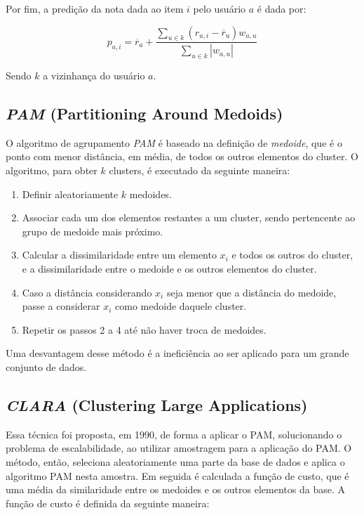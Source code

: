 \documentclass[12pt,a4paper,header]{abnt}
\begin{document}
Por fim, a predição da nota dada ao item $i$ pelo usuário $a$ é dada por:

\begin{equation}
p_{a, i} = \overline{r}_a + \frac{\sum_{u \in k}{(r_{u, i} - \overline{r}_u) w_{a, u}}}{\sum_{u \in k}{\left|w_{a, u}\right|}}
\end{equation}

Sendo $k$ a vizinhança do usuário $a$.

\subsection{\textit{PAM} (Partitioning Around Medoids)}

O algoritmo de agrupamento \textit{PAM} é baseado na definição de \textit{medoide}, que é o ponto com menor distância, em média, de todos os outros elementos do cluster. O algoritmo, para obter $k$ clusters, é executado da seguinte maneira\cite{do2005agrupamentos}:

\begin{enumerate}

\item{Definir aleatoriamente $k$ medoides.}
\item{Associar cada um dos elementos restantes a um cluster, sendo pertencente ao grupo de medoide mais próximo.}
\item{Calcular a dissimilaridade entre um elemento $x_i$ e todos os outros do cluster, e a dissimilaridade entre o medoide e os outros elementos do cluster.}
\item{Caso a distância considerando $x_i$ seja menor que a distância do medoide, passe a considerar $x_i$ como medoide daquele cluster.}
\item{Repetir os passos 2 a 4 até não haver troca de medoides.}

\end{enumerate}

Uma desvantagem desse método é a ineficiência ao ser aplicado para um grande conjunto de dados\cite{park2009simple}.

\subsection{\textit{CLARA} (Clustering Large Applications)}

Essa técnica foi proposta, em 1990, de forma a aplicar o PAM, solucionando o problema de escalabilidade, ao utilizar amostragem para a aplicação do PAM\cite{park2009simple}. O método, então, seleciona aleatoriamente uma parte da base de dados e aplica o algoritmo PAM nesta amostra. Em seguida é calculada a função de custo, que é uma média da similaridade entre os medoides e os outros elementos da base\cite{bhat2014k}. A função de custo é definida da seguinte maneira:
\end{document}
